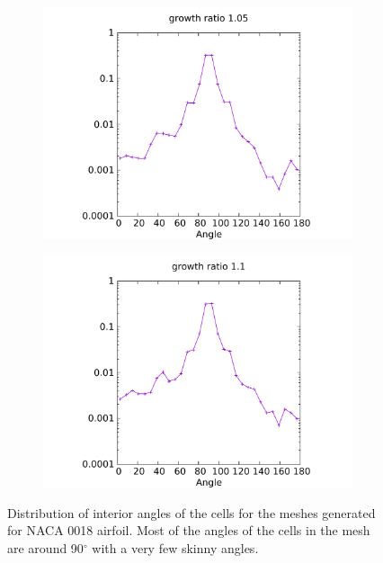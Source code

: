 \documentclass[conf]{new-aiaa}
\begin{document}
\begin{figure}
\centering
\begin{subfigure}{0.5\textwidth}
\centering
\includegraphics[width=0.9\linewidth]{meshCases/naca0018-x0.007-g1.05/angleDistribution.pdf}
\caption{}
\label{fig-dist-low}
\end{subfigure}%
\begin{subfigure}{0.5\textwidth}
\centering
\includegraphics[width = 0.9\linewidth]{meshCases/naca0018-x0.007-g1.1/angleDistribution.pdf}
\caption{}
\label{fig-dist-high}
\end{subfigure}
\caption{Distribution of interior angles of the cells for the meshes generated for NACA 0018 airfoil. Most of the angles of the cells in the mesh are around 90$^\circ$ with a very few skinny angles.}
\label{fig-angle-distribution}
\end{figure}
\end{document}
